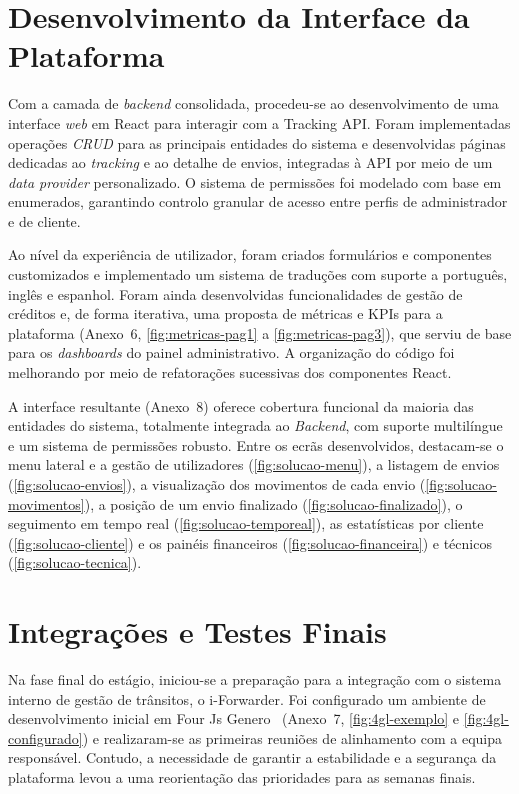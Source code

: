 \documentclass[a4paper,12pt]{report}
\begin{document}
\section{Desenvolvimento da Interface da Plataforma}

Com a camada de \textit{backend} consolidada, procedeu-se ao desenvolvimento de uma interface \textit{web} em React para interagir com a Tracking API. Foram implementadas operações \textit{CRUD} para as principais entidades do sistema e desenvolvidas páginas dedicadas ao \textit{tracking} e ao detalhe de envios, integradas à API por meio de um \textit{data provider} personalizado. O sistema de permissões foi modelado com base em enumerados, garantindo controlo granular de acesso entre perfis de administrador e de cliente.

Ao nível da experiência de utilizador, foram criados formulários e componentes customizados e implementado um sistema de traduções com suporte a português, inglês e espanhol. Foram ainda desenvolvidas funcionalidades de gestão de créditos e, de forma iterativa, uma proposta de métricas e KPIs para a plataforma (Anexo~6, \autoref{fig:metricas-pag1} a \autoref{fig:metricas-pag3}), que serviu de base para os \textit{dashboards} do painel administrativo. A organização do código foi melhorando por meio de refatorações sucessivas dos componentes React.

A interface resultante (Anexo~8) oferece cobertura funcional da maioria das entidades do sistema, totalmente integrada ao \textit{Backend}, com suporte multilíngue e um sistema de permissões robusto. Entre os ecrãs desenvolvidos, destacam-se o menu lateral e a gestão de utilizadores (\autoref{fig:solucao-menu}), a listagem de envios (\autoref{fig:solucao-envios}), a visualização dos movimentos de cada envio (\autoref{fig:solucao-movimentos}), a posição de um envio finalizado (\autoref{fig:solucao-finalizado}), o seguimento em tempo real (\autoref{fig:solucao-temporeal}), as estatísticas por cliente (\autoref{fig:solucao-cliente}) e os painéis financeiros (\autoref{fig:solucao-financeira}) e técnicos (\autoref{fig:solucao-tecnica}).

\section{Integrações e Testes Finais}

Na fase final do estágio, iniciou-se a preparação para a integração com o sistema interno de gestão de trânsitos, o i-Forwarder. Foi configurado um ambiente de desenvolvimento inicial em Four Js Genero~\cite{fourjs} (Anexo~7, \autoref{fig:4gl-exemplo} e \autoref{fig:4gl-configurado}) e realizaram-se as primeiras reuniões de alinhamento com a equipa responsável. Contudo, a necessidade de garantir a estabilidade e a segurança da plataforma levou a uma reorientação das prioridades para as semanas finais.
\end{document}
